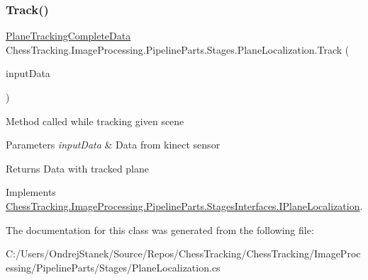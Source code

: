 \subsubsection{\texorpdfstring{Track()}{Track()}}
{\footnotesize\ttfamily \mbox{\hyperlink{class_chess_tracking_1_1_image_processing_1_1_pipeline_data_1_1_plane_tracking_complete_data}{Plane\+Tracking\+Complete\+Data}} Chess\+Tracking.\+Image\+Processing.\+Pipeline\+Parts.\+Stages.\+Plane\+Localization.\+Track (\begin{DoxyParamCaption}\item[{\mbox{\hyperlink{class_chess_tracking_1_1_image_processing_1_1_pipeline_data_1_1_input_data}{Input\+Data}}}]{input\+Data }\end{DoxyParamCaption})}



Method called while tracking given scene 


\begin{DoxyParams}{Parameters}
{\em input\+Data} & Data from kinect sensor\\
\hline
\end{DoxyParams}
\begin{DoxyReturn}{Returns}
Data with tracked plane
\end{DoxyReturn}


Implements \mbox{\hyperlink{interface_chess_tracking_1_1_image_processing_1_1_pipeline_parts_1_1_stages_interfaces_1_1_i_plane_localization_a03e2c5fc754830f91491a704352c24cf}{Chess\+Tracking.\+Image\+Processing.\+Pipeline\+Parts.\+Stages\+Interfaces.\+I\+Plane\+Localization}}.



The documentation for this class was generated from the following file\+:\begin{DoxyCompactItemize}
\item 
C\+:/\+Users/\+Ondrej\+Stanek/\+Source/\+Repos/\+Chess\+Tracking/\+Chess\+Tracking/\+Image\+Processing/\+Pipeline\+Parts/\+Stages/Plane\+Localization.\+cs\end{DoxyCompactItemize}
